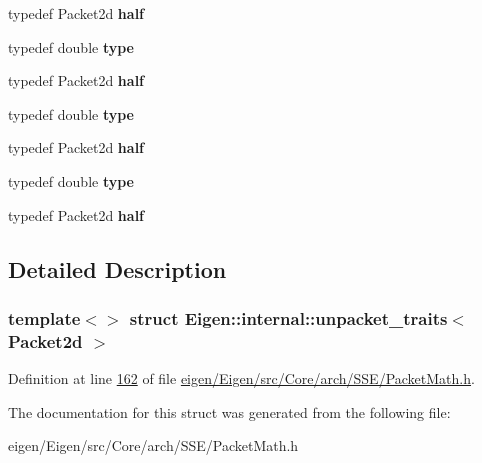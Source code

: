 \begin{DoxyCompactItemize}
typedef Packet2d {\bfseries half}
\item 
\mbox{\label{struct_eigen_1_1internal_1_1unpacket__traits_3_01_packet2d_01_4_ade249a255fbfe7ea4f99f773430eb5da}} 
typedef double {\bfseries type}
\item 
\mbox{\label{struct_eigen_1_1internal_1_1unpacket__traits_3_01_packet2d_01_4_af1820b9532d7c712b5d1d46fd94d2ea5}} 
typedef Packet2d {\bfseries half}
\item 
\mbox{\label{struct_eigen_1_1internal_1_1unpacket__traits_3_01_packet2d_01_4_ade249a255fbfe7ea4f99f773430eb5da}} 
typedef double {\bfseries type}
\item 
\mbox{\label{struct_eigen_1_1internal_1_1unpacket__traits_3_01_packet2d_01_4_af1820b9532d7c712b5d1d46fd94d2ea5}} 
typedef Packet2d {\bfseries half}
\item 
\mbox{\label{struct_eigen_1_1internal_1_1unpacket__traits_3_01_packet2d_01_4_ade249a255fbfe7ea4f99f773430eb5da}} 
typedef double {\bfseries type}
\item 
\mbox{\label{struct_eigen_1_1internal_1_1unpacket__traits_3_01_packet2d_01_4_af1820b9532d7c712b5d1d46fd94d2ea5}} 
typedef Packet2d {\bfseries half}
\end{DoxyCompactItemize}


\subsection{Detailed Description}
\subsubsection*{template$<$$>$\newline
struct Eigen\+::internal\+::unpacket\+\_\+traits$<$ Packet2d $>$}



Definition at line \hyperlink{eigen_2_eigen_2src_2_core_2arch_2_s_s_e_2_packet_math_8h_source_l00162}{162} of file \hyperlink{eigen_2_eigen_2src_2_core_2arch_2_s_s_e_2_packet_math_8h_source}{eigen/\+Eigen/src/\+Core/arch/\+S\+S\+E/\+Packet\+Math.\+h}.



The documentation for this struct was generated from the following file\+:\begin{DoxyCompactItemize}
\item 
eigen/\+Eigen/src/\+Core/arch/\+S\+S\+E/\+Packet\+Math.\+h\end{DoxyCompactItemize}
